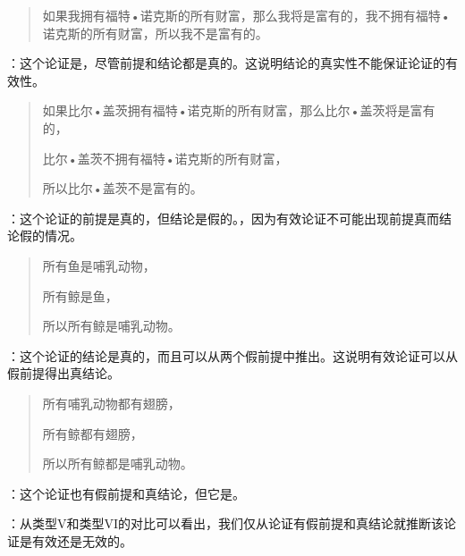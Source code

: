 \begin{examplebox}[title=类型III：无效论证 + 真前提 + 真结论]
\begin{quotation}
如果我拥有福特•诺克斯的所有财富，那么我将是富有的，我不拥有福特•诺克斯的所有财富，所以我不是富有的。
\end{quotation}

：这个论证是，尽管前提和结论都是真的。这说明结论的真实性不能保证论证的有效性。
\end{examplebox}

\begin{examplebox}[title=类型IV：无效论证 + 真前提 + 假结论]
\begin{quotation}
如果比尔•盖茨拥有福特•诺克斯的所有财富，那么比尔•盖茨将是富有的，

比尔•盖茨不拥有福特•诺克斯的所有财富，

所以比尔•盖茨不是富有的。
\end{quotation}

：这个论证的前提是真的，但结论是假的。，因为有效论证不可能出现前提真而结论假的情况。
\end{examplebox}

\begin{examplebox}[title=类型V：有效论证 + 假前提 + 真结论]
\begin{quotation}
所有鱼是哺乳动物，

所有鲸是鱼，

所以所有鲸是哺乳动物。
\end{quotation}

：这个论证的结论是真的，而且可以从两个假前提中推出。这说明有效论证可以从假前提得出真结论。
\end{examplebox}

\begin{examplebox}[title=类型VI：无效论证 + 假前提 + 真结论]
\begin{quotation}
所有哺乳动物都有翅膀，

所有鲸都有翅膀，

所以所有鲸都是哺乳动物。
\end{quotation}

：这个论证也有假前提和真结论，但它是。
\end{examplebox}

：从类型V和类型VI的对比可以看出，我们仅从论证有假前提和真结论就推断该论证是有效还是无效的。

